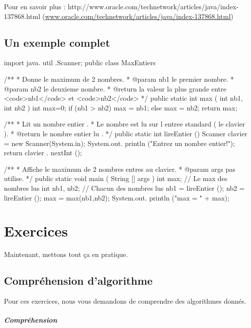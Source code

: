 \documentclass[11pt,a4paper]{article}
\begin{document}
            \par
        
        Pour en savoir plus : 
        http://www.oracle.com/technetwork/articles/java/index-137868.html (\url{www.oracle.com/technetwork/articles/java/index-137868.html})
            \par
        \subsection{Un exemple complet}\begin{Java}

import java. util .Scanner;
public class MaxEntiers {
    /**
    * Donne le maximum de 2 nombres.
    * @param nb1 le premier nombre.
    * @param nb2 le deuxieme nombre.
    * @return la valeur la plus grande entre <code>nb1</code> et <code>nb2</code>
    */
    public static int max ( int nb1, int nb2 ) {
      int max=0;
      if (nb1 > nb2) {
        max = nb1;
      } else {
        max = nb2;
      }
      return max;
    }
    
    /**
    * Lit un nombre entier .
    * Le nombre est lu sur l entree standard ( le clavier ).
    * @return le nombre entier lu .
    */
    public static int lireEntier () {
    Scanner clavier = new Scanner(System.in);
    System.out. println ("Entrez un nombre entier!");
      return clavier . nextInt ();
    }
    
    /**
    * Affiche le maximum de 2 nombres entres au clavier.
    * @param args pas utilise.
    */
    public static void main ( String [] args ) {
      int max; // Le max des nombres lus
      int nb1, nb2; // Chacun des nombres lus
      nb1 = lireEntier ();
      nb2 = lireEntier ();
      max = max(nb1,nb2);
      System.out. println ("max = " + max);
    }
}				\end{Java}\section{Exercices}
				Maintenant, mettons tout \c ca en pratique.
      
            \par
        \subsection{Compr\'ehension d'algorithme}
          Pour ces exercices, nous vous demandons de comprendre des algorithmes donn\'es. 
          
			
		\subparagraph{Compr\'ehension} 
		
\end{document}
